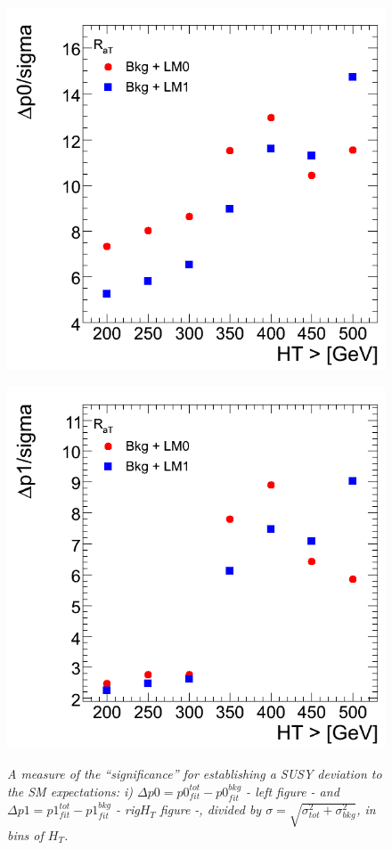 \begin{figure}[h!]
\vspace{5mm}
\begin{minipage}[b]{0.5\linewidth}
\centering
{\label{fig:m$H_{T}$ov$H_{T}$}\includegraphics[scale=0.38]{./plots/aT-Dp0OvSigma.png}} 
\end{minipage}
\begin{minipage}[b]{0.5\linewidth}
\centering
{\label{fig:$H_{T}$}\includegraphics[scale=0.38]{./plots/aT-Dp1OvSigma.png}} 
\end{minipage}
\caption{\textit{A measure of the ``significance'' for establishing a SUSY deviation to the SM expectations: i) $\Delta p0 = p0_{fit}^{tot} - p0_{fit}^{bkg}$ - left figure - and $\Delta p1 = p1_{fit}^{tot} - p1_{fit}^{bkg}$ - rig$H_{T}$ figure -, divided by $\sigma = \sqrt{\sigma_{tot}^{2} + \sigma_{bkg}^{2}}$, in bins of $H_{T}$.  }}
\label{fig:sum2}
\end{figure}

